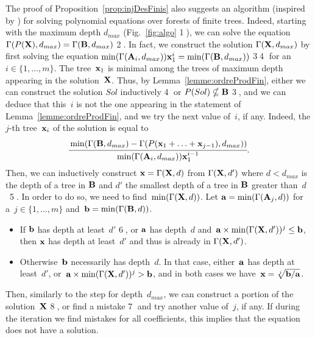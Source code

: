 		The proof of Proposition~\ref{prop:injDesFinis} also suggests an algorithm (inspired by \cite[Algorithm~1]{kroot}) for solving polynomial equations over forests of finite trees. 
		Indeed, starting with the maximum depth $d_{max}$ (Fig.~\ref{fig:algo} \textcircled{1}), we can solve the equation $\Gamma(P(\forest{x}), d_{max}) = \Gamma(\forest{b}, d_{max})$ \textcircled{2}.
		In fact, we construct the solution $\Gamma(\forest{X},d_{max})$ by first solving the equation $\min(\Gamma(\forest{A}_i,d_{max})) \tree{x}_1^i = \min(\Gamma(\forest{b}, d_{max}))$ \textcircled{3}\textcircled{4} for an~$i \in \{1, \ldots, m\}$. 
		The tree~$\tree{x}_1$ is minimal among the trees of maximum depth appearing in the solution~$\forest{X}$. 
		Thus, by Lemma~\ref{lemme:ordreProdFin}, either we can construct the solution $Sol$ inductively \textcircled{4} or $P(Sol) \nsubseteq \forest{B}$ \textcircled{3}, and we can deduce that this~$i$ is not the one appearing in the statement of Lemma~\ref{lemme:ordreProdFin}, and we try the next value of~$i$, if any.
		Indeed, the $j$-th tree~$\tree{x}_i$ of the solution is equal to
	        \[
	        \cfrac{\min(\Gamma(\forest{b}, d_{max}) - \Gamma(P(\tree{x}_1 + \ldots + \tree{x}_{j-1}), d_{max}))}{\min(\Gamma(\forest{A}_i,d_{max})) \tree{x}_1^{i-1}}.
	        \]
     	Then, we can inductively construct $\tree{x} = \Gamma(\forest{X}, d)$ from $\Gamma(\forest{x}, d')$ where $d < d_{max}$ is the depth of a tree in $\forest{B}$ and $d'$ the smallest depth of a tree in $\forest{B}$ greater than~$d$~\textcircled{5}. In order to do so, we need to find~$\min(\Gamma(\forest{X}, d))$. Let $\tree{a} = \min(\Gamma(\forest{A}_j,d))$ for a~$j \in \{1, \ldots, m\}$ and~$\tree{b} = \min(\Gamma(\forest{B},d))$.
     	\begin{itemize}
	        \item If $\tree{b}$ has depth at least~$d'$ \textcircled{6}, or $\tree{a}$ has depth~$d$ and~$\tree{a} \times \min(\Gamma(\forest{X}, d'))^j \le \tree{b}$, then $\tree{x}$ has depth at least~$d'$ and thus is already in $\Gamma(\forest{x}, d')$.
	        \item Otherwise~$\tree{b}$ necessarily has depth~$d$. In that case, either~$\tree{a}$ has depth at least~$d'$, or~$\tree{a} \times \min(\Gamma(\forest{X}, d'))^j > \tree{b}$, and in both cases we have~$\tree{x} = \sqrt[j]{\tree{b} / \tree{a}}$.
     	\end{itemize}
		Then, similarly to the step for depth~$d_{max}$, we can construct a portion of the solution~$\forest{X}$ \textcircled{8}, or find a mistake \textcircled{7} and try another value of~$j$, if any. If during the iteration we find mistakes for all coefficients, this implies that the equation does not have a solution.
		
